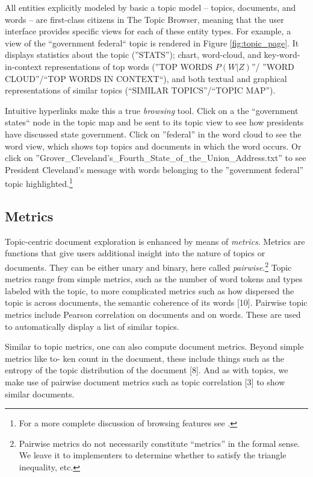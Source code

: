 \documentclass[11pt]{article}
\begin{document}
All entities explicitly modeled by basic a topic model -- topics, documents, and
words -- are first-class citizens in The Topic Browser, meaning that the user
interface provides specific views for each of these entity types. For example, a
view of the ``government federal`` topic is rendered in Figure \ref{fig:topic_page}.
It displays statistics about the topic (''STATS''); chart, word-cloud, and
key-word-in-context representations of top words (''TOP WORDS $P(W|Z)$''/
''WORD CLOUD''/``TOP WORDS IN CONTEXT``), and both textual and graphical
representations of similar topics (``SIMILAR TOPICS''/``TOPIC MAP'').

Intuitive hyperlinks make this a true \textit{browsing} tool. Click on a the
``government states`` node in the topic map and be sent to its topic view to see
how presidents have discussed state government. Click on ''federal'' in the word
cloud to see the word view, which shows top topics and documents in which the
word occurs. Or click on ''Grover\_\allowbreak{}Cleveland's\_\allowbreak{}Fourth\_\allowbreak{}State\_\allowbreak{}of\_\allowbreak{}the\_\allowbreak{}Union\_\allowbreak{}Address.txt''
to see President Cleveland's message with words belonging to the ''government federal''
topic highlighted.\footnote{For a more complete discussion
of browsing features see \cite{gardner_browser_2010}.}%

\subsection{Metrics}
Topic-centric document exploration is enhanced by means of \textit{metrics}.
Metrics are functions that give users additional insight into the nature of
topics or documents. They can be either unary and binary,
here called \textit{pairwise}.\footnote{Pairwise metrics do not necessarily
constitute ``metrics'' in the formal sense. We leave it to implementers to
determine whether to satisfy the triangle inequality, etc.} Topic metrics range
from simple metrics, such as the number of word tokens and types labeled with
the topic, to more complicated metrics such as how dispersed the topic is across
documents, the semantic coherence of its words [10]. Pairwise topic metrics
include Pearson correlation on documents and on words. These are used to automatically
display a list of similar topics.

Similar to topic metrics, one can also compute document metrics. Beyond simple metrics like to-
ken count in the document, these include things such as the entropy of the topic distribution of
the document [8]. And as with topics, we make use of pairwise document metrics such as topic
correlation [3] to show similar documents.
\end{document}
